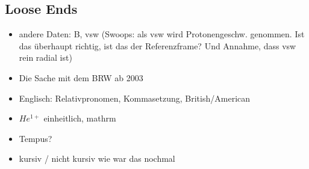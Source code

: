 \subsection{Loose Ends}
\begin{itemize}
	\item andere Daten: B, vsw (Swoops: als vsw wird Protonengeschw. genommen. Ist das überhaupt richtig, ist das der Referenzframe? Und Annahme, dass vsw rein radial ist)
	\item Die Sache mit dem BRW ab 2003
	\item Englisch: Relativpronomen, Kommasetzung, British/American
	\item $He^{1+}$ einheitlich, mathrm
	\item Tempus?
	\item kursiv / nicht kursiv wie war das nochmal
\end{itemize}
